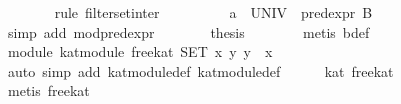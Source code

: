 \begin{isabellebody}
\ \ \ \ \ \ \isamarkupfalse%
\ {}rule\ filter{}set{}inter{}\isanewline
\ \ \ \ \isamarkupfalse%
\ \isamarkupfalse%
\ {}{}{}{}\ {}\ a\ {}\ UNIV\ {}\ pred{}expr\ B{}\isanewline
\ \ \ \ \ \ \isamarkupfalse%
\ {}simp\ add{}\ mod{}pred{}expr{}\isanewline
\ \ \ \ \isamarkupfalse%
\ \isamarkupfalse%
\ {}thesis\isanewline
\ \ \ \ \ \ \isamarkupfalse%
\ {}metis\ b{}def{}\isanewline
\ \ \isamarkupfalse%
%
\endisatagproof
{\isafoldproof}%
%
\isadelimproof
\isanewline
%
\endisadelimproof
\isanewline
\isanewline
\ \ \isamarkupfalse%
\ module{}\ {}kat{}module\ free{}kat\ SET\ {}{}x\ y{}\ y\ {}\ x{}{}\isanewline
%
\isadelimproof
\ \ %
\endisadelimproof
%
\isatagproof
{}\isamarkupfalse%
\ {}auto\ simp\ add{}\ kat{}module{}def\ kat{}module{}{}def{}\isanewline
\ \ \ \ \isamarkupfalse%
\ {}kat\ free{}kat{}\isanewline
\ \ \ \ \ \ \isamarkupfalse%
\ {}metis\ free{}kat{}\isanewline

\end{isabellebody}
